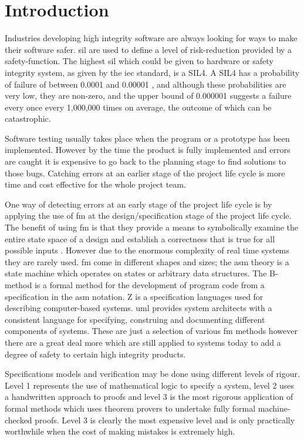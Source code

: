 
\chapter{Introduction}
\label{ch:introduction}

Industries developing high integrity software are always looking for ways to make their software safer. \gls{sil} are used to define a level of risk-reduction provided by a safety-function. The highest \gls{sil} \cite{siliso} which could be given to hardware or safety integrity system, as given by the \gls{iec} \cite{iec} standard, is a SIL4. A SIL4 has a probability of failure of between 0.0001 and 0.00001 \cite{IEC61508}, and although these probabilities are very low, they are non-zero, and the upper bound of 0.000001 suggests a failure every once every 1,000,000 times on average, the outcome of which can be catastrophic.

Software testing usually takes place when the program or a prototype has been implemented. However by the time the product is fully implemented and errors are caught it is expensive to go back to the planning stage to find solutions to those bugs. Catching errors at an earlier stage of the project life cycle is more time and cost effective for the whole project team.

One way of detecting errors at an early stage of the project life cycle is by applying the use of \gls{fm} at the design/specification stage of the project life cycle. The benefit of using \gls{fm} is that they provide a means to symbolically examine the entire state space of a design and establish a correctness that is true for all possible inputs \cite{wifrm}. However due to the enormous complexity of real time systems they are rarely used. \Gls{fm} come in different shapes and sizes; the \gls{asm} theory is a state machine which operates on states or arbitrary data structures. The B-method \cite{bmeth} is a formal method for the development of program code from a specification in the \gls{asm} notation. Z \cite{spiveyreferencemanual} is a specification languages used for describing computer-based systems. \Gls{uml} provides system architects with a consistent language for specifying, construing and documenting different components of systems. These are just a selection of various \gls{fm} methods however there are a great deal more which are still applied to systems today to add a degree of safety to certain high integrity products.

Specifications models and verification may be done using different levels of rigour. Level 1 represents the use of mathematical logic to specify a system, level 2 uses a handwritten approach to proofs and level 3 is the most rigorous application of formal methods which uses theorem provers to undertake fully formal machine-checked proofs. Level 3 is clearly the most expensive level and is only practically worthwhile when the cost of making mistakes is extremely high.

